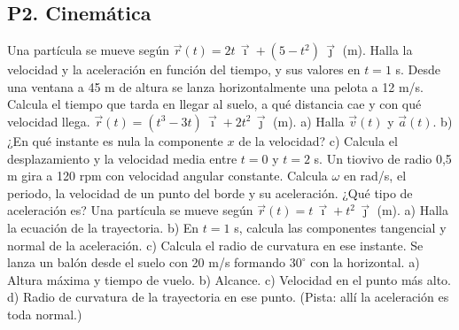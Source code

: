 \documentclass[11pt,a4paper]{article}
\newcommand{\ii}{\vec{\imath}}
\newcommand{\jj}{\vec{\jmath}}
\begin{document}
\subsection*{P2. Cinemática}
\begin{enumerate}[leftmargin=1.4cm,itemsep=5pt]
 Una partícula se mueve según $\vec r(t)=2t\,\ii+(5-t^2)\,\jj$ (m). Halla la velocidad y la aceleración en función del tiempo, y sus valores en $t=1$ s.
 Desde una ventana a 45 m de altura se lanza horizontalmente una pelota a 12 m/s. Calcula el tiempo que tarda en llegar al suelo, a qué distancia cae y con qué velocidad llega.
 $\vec r(t)=(t^3-3t)\,\ii+2t^2\,\jj$ (m). a) Halla $\vec v(t)$ y $\vec a(t)$. b) ¿En qué instante es nula la componente $x$ de la velocidad? c) Calcula el desplazamiento y la velocidad media entre $t=0$ y $t=2$ s.
 Un tiovivo de radio 0,5 m gira a 120 rpm con velocidad angular constante. Calcula $\omega$ en rad/s, el periodo, la velocidad de un punto del borde y su aceleración. ¿Qué tipo de aceleración es?
 Una partícula se mueve según $\vec r(t)=t\,\ii+t^2\,\jj$ (m). a) Halla la ecuación de la trayectoria. b) En $t=1$ s, calcula las componentes tangencial y normal de la aceleración. c) Calcula el radio de curvatura en ese instante.
 Se lanza un balón desde el suelo con 20 m/s formando $30^\circ$ con la horizontal. a) Altura máxima y tiempo de vuelo. b) Alcance. c) Velocidad en el punto más alto. d) Radio de curvatura de la trayectoria en ese punto. (Pista: allí la aceleración es toda normal.)
\end{enumerate}
\end{document}
